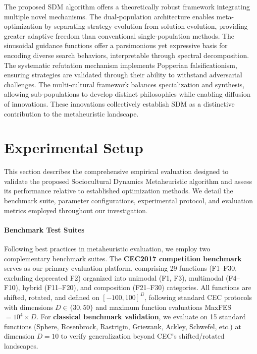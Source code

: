 \documentclass[11pt]{article}
\begin{document}
The proposed SDM algorithm offers a theoretically robust framework integrating multiple novel mechanisms. The dual-population architecture enables meta-optimization by separating strategy evolution from solution evolution, providing greater adaptive freedom than conventional single-population methods. The sinusoidal guidance functions offer a parsimonious yet expressive basis for encoding diverse search behaviors, interpretable through spectral decomposition. The systematic refutation mechanism implements Popperian falsificationism, ensuring strategies are validated through their ability to withstand adversarial challenges. The multi-cultural framework balances specialization and synthesis, allowing sub-populations to develop distinct philosophies while enabling diffusion of innovations. These innovations collectively establish SDM as a distinctive contribution to the metaheuristic landscape.







\section{Experimental Setup}
\label{sec:experimental_setup}

This section describes the comprehensive empirical evaluation designed to validate the proposed Sociocultural Dynamics Metaheuristic algorithm and assess its performance relative to established optimization methods. We detail the benchmark suite, parameter configurations, experimental protocol, and evaluation metrics employed throughout our investigation.

\paragraph{Benchmark Test Suites} Following best practices in metaheuristic evaluation, we employ two complementary benchmark suites. The \textbf{CEC2017 competition benchmark}~\citep{awad2017cec} serves as our primary evaluation platform, comprising 29 functions (F1--F30, excluding deprecated F2) organized into unimodal (F1, F3), multimodal (F4--F10), hybrid (F11--F20), and composition (F21--F30) categories. All functions are shifted, rotated, and defined on $[-100, 100]^D$, following standard CEC protocols with dimensions $D \in \{30, 50\}$ and maximum function evaluations MaxFES $= 10^4 \times D$. For \textbf{classical benchmark validation}, we evaluate on 15 standard functions (Sphere, Rosenbrock, Rastrigin, Griewank, Ackley, Schwefel, etc.) at dimension $D = 10$ to verify generalization beyond CEC's shifted/rotated landscapes.
\end{document}
